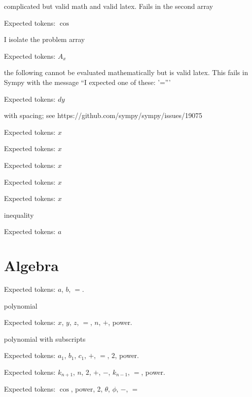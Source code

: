 \documentclass{article}
\begin{document}
complicated but valid math and valid latex. Fails in the second array  

Expected tokens: $\cos$

\hrulefill

I isolate the problem array

Expected tokens: $A_{x}$

\hrulefill

the following cannot be evaluated mathematically but is valid latex. 
This fails in Sympy with the message ``I expected one of these: '='''

Expected tokens: $dy$

\hrulefill

with spacing; see https://github.com/sympy/sympy/issues/19075

Expected tokens: $x$

\hrulefill


Expected tokens: $x$

\hrulefill


Expected tokens: $x$

\hrulefill


Expected tokens: $x$

\hrulefill


Expected tokens: $x$

\hrulefill

inequality

Expected tokens: $a$

\hrulefill

\section{Algebra}

\hrulefill


Expected tokens: $a$, $b$, $=$.

\hrulefill

polynomial
    
Expected tokens: $x$, $y$, $z$, $=$, $n$, $+$, power.

\hrulefill

polynomial with subscripts
    
Expected tokens: $a_1$, $b_1$, $c_1$, $+$, $=$, $2$, power.

\hrulefill


    
Expected tokens: $k_{n+1}$, $n$, $2$, $+$, $-$, $k_{n-1}$, $=$, power.

\hrulefill


    
Expected tokens: $\cos$, power, 2, $\theta$, $\phi$, $-$, $=$
\end{document}
